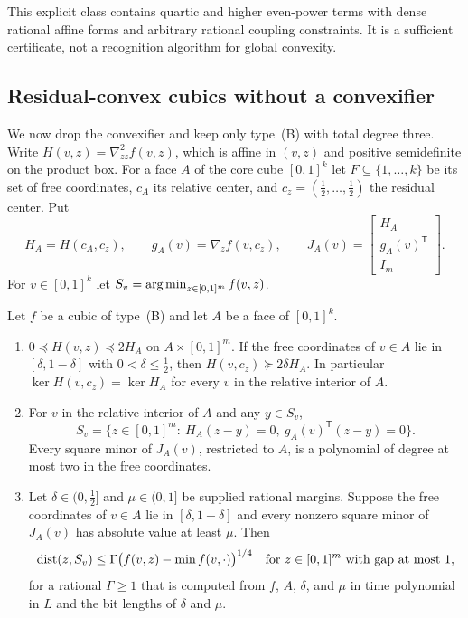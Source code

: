 This explicit class contains quartic and higher even-power terms with
dense rational affine forms and arbitrary rational coupling
constraints. It is a sufficient certificate, not a recognition
algorithm for global convexity.

\subsection{Residual-convex cubics without a convexifier}
\label{sec:recourse-cubic}

We now drop the convexifier and keep only type~(B) with total degree
three. Write $H(v,z)=\nabla^2_{zz}f(v,z)$, which is affine in $(v,z)$
and positive semidefinite on the product box. For a face $A$ of the
core cube $[0,1]^k$ let $F\subseteq\{1,\ldots,k\}$ be its set of free
coordinates, $c_A$ its relative center, and $c_z=(\frac12,\ldots,\frac12)$
the residual center. Put
\[
 H_A=H(c_A,c_z),\qquad g_A(v)=\nabla_zf(v,c_z),\qquad
 J_A(v)=\begin{bmatrix}H_A\\ g_A(v)^{\mathsf T}\\ I_m\end{bmatrix}.
\]
For $v\in[0,1]^k$ let $S_v=\operatorname*{arg\,min}_{z\in[0,1]^m}f(v,z)$.

\begin{proposition}
\label{prop:recourse-fiber}
Let $f$ be a cubic of type~(B) and let $A$ be a face of $[0,1]^k$.
\begin{enumerate}[label=(\alph*)]
\item $0\preceq H(v,z)\preceq2H_A$ on $A\times[0,1]^m$. If the free
coordinates of $v\in A$ lie in $[\delta,1-\delta]$ with
$0<\delta\le\frac12$, then $H(v,c_z)\succeq2\delta H_A$. In particular
$\ker H(v,c_z)=\ker H_A$ for every $v$ in the relative interior of $A$.
\item For $v$ in the relative interior of $A$ and any $y\in S_v$,
\[
 S_v=\{z\in[0,1]^m:\ H_A(z-y)=0,\ g_A(v)^{\mathsf T}(z-y)=0\}.
\]
Every square minor of $J_A(v)$, restricted to $A$, is a polynomial of
degree at most two in the free coordinates.
\item Let $\delta\in(0,\frac12]$ and $\mu\in(0,1]$ be supplied rational
margins. Suppose the free coordinates of $v\in A$ lie in
$[\delta,1-\delta]$ and every nonzero square minor of $J_A(v)$ has
absolute value at least $\mu$. Then
\[
 \operatorname{dist}(z,S_v)\le\Gamma\bigl(f(v,z)-\min f(v,\cdot)\bigr)^{1/4}
 \quad\text{for } z\in[0,1]^m \text{ with gap at most }1,
\]
for a rational $\Gamma\ge1$ that is computed from $f$, $A$, $\delta$,
and $\mu$ in time polynomial in $L$ and the bit lengths of $\delta$
and $\mu$.
\end{enumerate}
\end{proposition}

